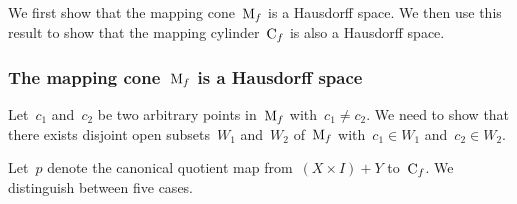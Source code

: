 \subsection{}

We first show that the mapping cone~$\operatorname{M}_f$ is a Hausdorff space.
We then use this result to show that the mapping cylinder~$\operatorname{C}_f$ is also a Hausdorff space.



\subsubsection*{The mapping cone~$\operatorname{M}_f$ is a Hausdorff space}

Let~$c_1$ and~$c_2$ be two arbitrary points in~$\operatorname{M}_f$ with~$c_1 ≠ c_2$.
We need to show that there exists disjoint open subsets~$W_1$ and~$W_2$ of~$\operatorname{M}_f$ with~$c_1 ∈ W_1$ and~$c_2 ∈ W_2$.

Let~$p$ denote the canonical quotient map from~$(X × I) + Y$ to~$\operatorname{C}_f$.
We distinguish between five cases.

